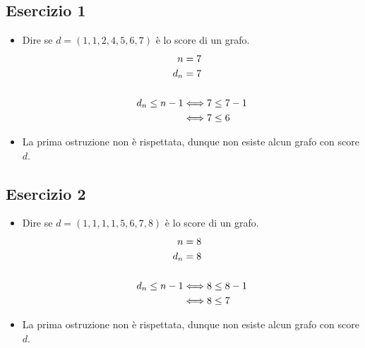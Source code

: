 \documentclass[10pt]{article}
\begin{document}
	\subsection{Esercizio 1}
	\begin{itemize}
	\item
	Dire se $d = (1,1,2,4,5,6,7)$ è lo score di un grafo.
	\begin{equation}
	\begin{split}
		n &= 7 \\
		d_n &= 7 \\ 
		& \\
		d_n \leq n - 1 &\Longleftrightarrow 7 \leq 7 - 1  \\
		&\Longleftrightarrow 7 \leq 6
		\notag
		\end{split}
	\end{equation}
	\item
	La prima ostruzione non è rispettata, dunque non esiste alcun grafo con score $d$.
	\end{itemize}
	
	\subsection{Esercizio 2}
	\begin{itemize}
	\item
	Dire se $d = (1,1,1,1,5,6,7,8)$ è lo score di un grafo.
	\begin{equation}
	\begin{split}
		n &= 8 \\
		d_n &= 8 \\ 
		& \\
		d_n \leq n - 1 &\Longleftrightarrow 8 \leq 8 - 1  \\
		&\Longleftrightarrow 8 \leq 7
		\notag
		\end{split}
	\end{equation}
	\item
	La prima ostruzione non è rispettata, dunque non esiste alcun grafo con score $d$.
	\end{itemize}
	
\end{document}
